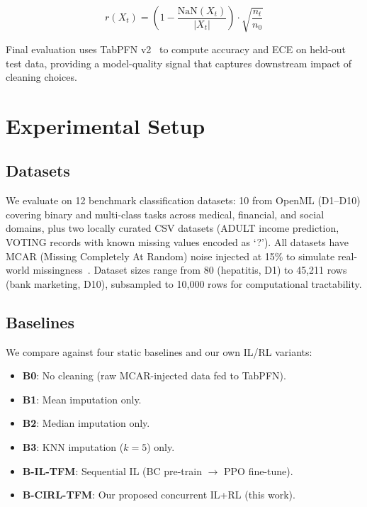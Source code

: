 \documentclass[conference]{IEEEtran}
\begin{document}
\begin{equation}
r(X_t) = \left(1 - \frac{\text{NaN}(X_t)}{|X_t|}\right) \cdot
\sqrt{\frac{n_t}{n_0}}
\end{equation}

Final evaluation uses TabPFN v2~\cite{hollmann2025tabpfn} to compute
accuracy and ECE on held-out test data, providing a model-quality signal
that captures downstream impact of cleaning choices.

\section{Experimental Setup}

\subsection{Datasets}

We evaluate on 12 benchmark classification datasets: 10 from OpenML
(D1--D10) covering binary and multi-class tasks across medical, financial,
and social domains, plus two locally curated CSV datasets (ADULT income
prediction, VOTING records with known missing values encoded as `?').
All datasets have MCAR (Missing Completely At Random) noise injected at
15\% to simulate real-world missingness~\cite{rubin1976inference}.
Dataset sizes range from 80 (hepatitis, D1) to 45,211 rows (bank marketing,
D10), subsampled to 10,000 rows for computational tractability.

\subsection{Baselines}

We compare against four static baselines and our own IL/RL variants:
\begin{itemize}
    \item \textbf{B0}: No cleaning (raw MCAR-injected data fed to TabPFN).
    \item \textbf{B1}: Mean imputation only.
    \item \textbf{B2}: Median imputation only.
    \item \textbf{B3}: KNN imputation ($k=5$) only.
    \item \textbf{B-IL-TFM}: Sequential IL (BC pre-train $\rightarrow$
    PPO fine-tune).
    \item \textbf{B-CIRL-TFM}: Our proposed concurrent IL+RL (this work).
\end{itemize}
\end{document}
